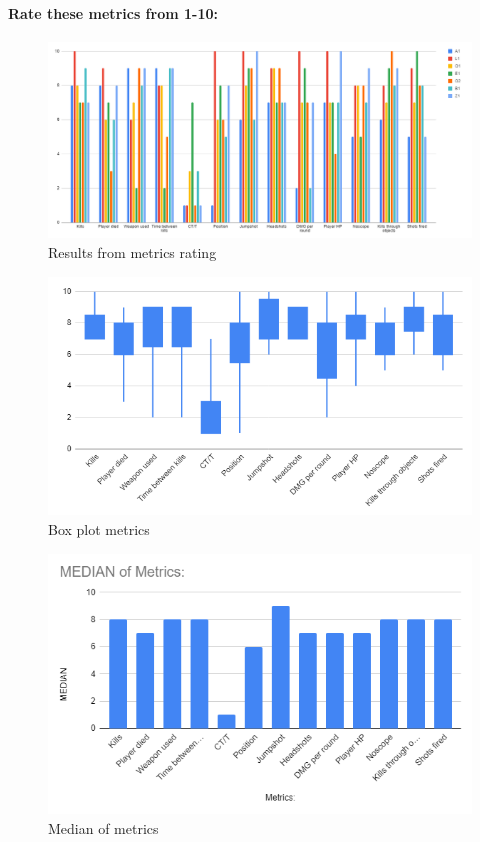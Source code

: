 \paragraph{Rate these metrics from 1-10:}

    \begin{figure}[H]
        \centering
        \includegraphics[width=17cm]{Images/All_results.png}
        \caption{Results from metrics rating}
        \label{fig:Barchart}
    \end{figure}
    \begin{figure}[H]
        \centering
        \includegraphics[width=17cm]{Images/boxplot.png}
        \caption{Box plot metrics}
        \label{fig:BoxplotMetrics}
    \end{figure}
    \begin{figure}[H]
        \centering
        \includegraphics[width=17cm]{Images/medianMetrics.png}
        \caption{Median of metrics}
        \label{fig:medianMetrics}
    \end{figure}
